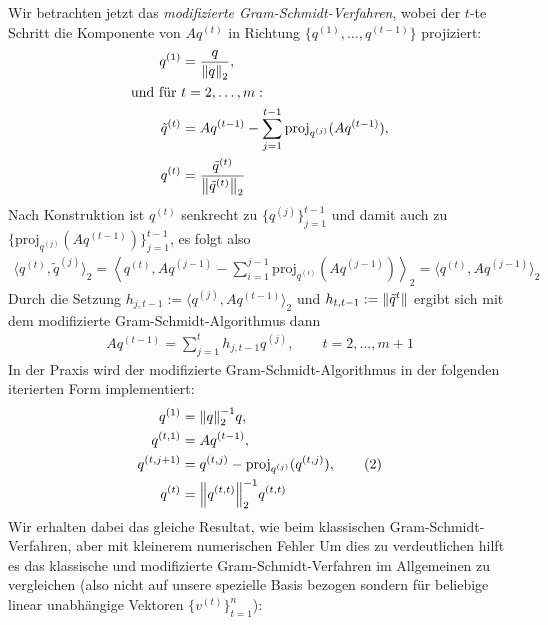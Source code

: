 Wir betrachten jetzt das \textit{modifizierte Gram-Schmidt-Verfahren}, 
wobei der $t$-te Schritt die Komponente von $Aq^{(t)}$ in Richtung $\{q^{(1)},\dots,q^{(t-1)}\}$ projiziert:
%
\begin{align*}
  q^{(1)} 
  &= \dfrac{q}{\vertn{2}{q}_2},\\
  \text{und für } &t=2,\dots,m: \\
  \tilde{q}^{(t)} 
  &= Aq^{(t-1)} - \sum_{j=1}^{t-1} \text{proj}_{q^{(j)}}(Aq^{(t-1)}), \\
  q^{(t)} &
  = \dfrac{\tilde{q}^{(t)}}{\vertn{2}{\tilde{q}^{(t)}}_2}
\end{align*}
%
Nach Konstruktion ist $q^{(t)}$ senkrecht zu $\{q^{(j)}\}_{j=1}^{t-1}$ und damit auch zu 
$\{\text{proj}_{q^{(j)}}(Aq^{(t-1)})\}_{j=1}^{t-1}$, es folgt also
% 
\begin{align*}
  \langle q^{(t)}, \tilde{q}^{(j)}\rangle_2 
  = \left\langle q^{(t)}, Aq^{(j-1)} - \sum_{i=1}^{j-1} \text{proj}_{q^{(i)}}(Aq^{(j-1)})\right\rangle _2 
  = \langle q^{(t)}, Aq^{(j-1)}\rangle_2
\end{align*}
%
Durch die Setzung $h_{j,t-1} := \langle q^{(j)},Aq^{(t-1)} \rangle_2$ und $h_{t,t-1}:=\vertn{2}{\tilde{q}^{t}}$ 
ergibt sich mit dem modifizierte Gram-Schmidt-Algorithmus dann
%
\begin{align*}
  Aq^{(t-1)}
  =\sum_{j=1}^{t} h_{j,t-1 }q^{(j)}, 
  \qquad t=2,\dots,m+1
  \tag{1}\label{eq:arnoldiEQ1}
\end{align*}
%
In der Praxis wird der modifizierte Gram-Schmidt-Algorithmus in der folgenden iterierten Form implementiert:
%
\begin{align*}
  q^{(1)} &= \vertn{2}{q}_2^{-1}q, \\
  q^{(t,1)} &= Aq^{(t-1)}, \\
  q^{(t,j+1)} &= q^{(t,j)}-\text{proj}_{q^{(j)}}(q^{(t,j)}), 
  \tag{2}\label{eq:arnoldiEQ2}\\
  q^{(t)} &= \vertn{2}{q^{(t,t)}}_2^{-1}q^{(t,t)}
\end{align*}
%
Wir erhalten dabei das gleiche Resultat, wie beim klassischen Gram-Schmidt-Verfahren, 
aber mit kleinerem numerischen Fehler Um dies zu verdeutlichen hilft es 
das klassische und modifizierte Gram-Schmidt-Verfahren im Allgemeinen zu vergleichen 
(also nicht auf unsere spezielle Basis bezogen sondern für beliebige linear unabhängige Vektoren $\{v^{(t)}\}_{t=1}^n$):

